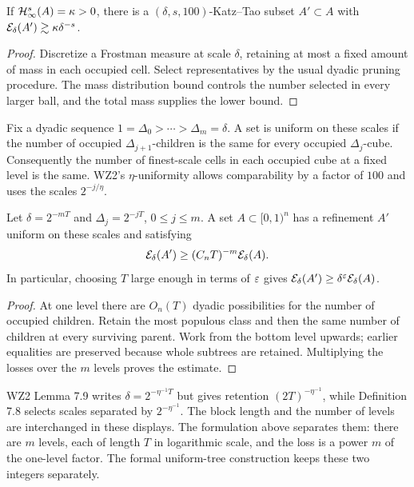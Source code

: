 \begin{lemma}
\label{lem:content-to-kt}
If $\mathcal{H}^s_\infty(A)=\kappa>0$, there is a
$(\delta,s,100)$-Katz--Tao subset $A'\subset A$ with
$\mathcal{E}_\delta(A')\gtrsim\kappa\delta^{-s}$.
\end{lemma}
\begin{proof}
Discretize a Frostman measure at scale $\delta$, retaining at most a
fixed amount of mass in each occupied cell. Select representatives
by the usual dyadic pruning procedure. The mass distribution bound
controls the number selected in every larger ball, and the total
mass supplies the lower bound.
\end{proof}

\begin{definition}
\label{def:uniform-set}
Fix a dyadic sequence $1=\Delta_0>\cdots>\Delta_m=\delta$.
A set is uniform on these scales if the number of occupied
$\Delta_{j+1}$-children is the same for every occupied
$\Delta_j$-cube. Consequently the number of finest-scale cells in
each occupied cube at a fixed level is the same. WZ2's
$\eta$-uniformity allows comparability by a factor of $100$ and uses
the scales $2^{-j/\eta}$.
\end{definition}

\begin{lemma}
\label{lem:uniform-set}
Let $\delta=2^{-mT}$ and $\Delta_j=2^{-jT}$, $0\leq j\leq m$.
A set $A\subset[0,1)^n$ has a refinement $A'$ uniform on these
scales and satisfying
\[
                   \mathcal{E}_\delta(A')\geq (C_nT)^{-m}\mathcal{E}_\delta(A).
\]
In particular, choosing $T$ large enough in terms of $\varepsilon$ gives
$\mathcal{E}_\delta(A')\geq\delta^\varepsilon\mathcal{E}_\delta(A)$.
\end{lemma}
\begin{proof}
At one level there are $O_n(T)$ dyadic possibilities for the number
of occupied children. Retain the most populous class and then the
same number of children at every surviving parent. Work from the
bottom level upwards; earlier equalities are preserved because
whole subtrees are retained. Multiplying the losses over the $m$
levels proves the estimate.
\end{proof}

\begin{remark}
\label{rem:uniform-parameters}
WZ2 Lemma 7.9 writes $\delta=2^{-\eta^{-1}T}$ but gives retention
$(2T)^{-\eta^{-1}}$, while Definition 7.8 selects scales separated
by $2^{-\eta^{-1}}$. The block length and the number of levels are
interchanged in these displays. The formulation above separates them:
there are $m$ levels, each of length $T$ in logarithmic scale, and
the loss is a power $m$ of the one-level factor. The formal
uniform-tree construction keeps these two integers separately.
\end{remark}


